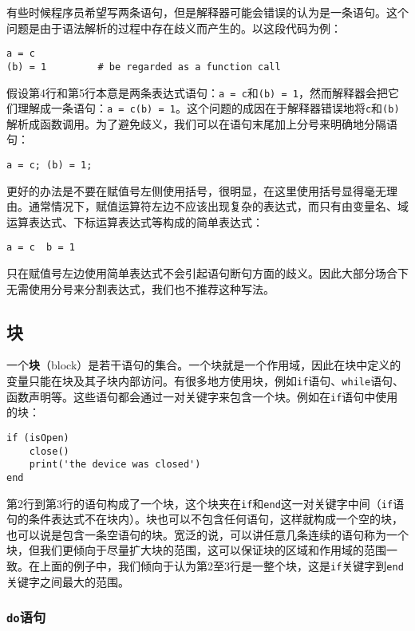 有些时候程序员希望写两条语句，但是解释器可能会错误的认为是一条语句。这个问题是由于语法解析的过程中存在歧义而产生的。以这段代码为例：
\begin{lstlisting}[language=berry, numbers=none]
a = c
(b) = 1         # be regarded as a function call
\end{lstlisting}
假设第4行和第5行本意是两条表达式语句：\texttt{a = c}和\texttt{(b) = 1}，然而解释器会把它们理解成一条语句：\texttt{a = c(b) = 1}。这个问题的成因在于解释器错误地将\texttt{c}和\texttt{(b)}解析成函数调用。为了避免歧义，我们可以在语句末尾加上分号来明确地分隔语句：
\begin{lstlisting}[language=berry, numbers=none]
a = c; (b) = 1;
\end{lstlisting}
更好的办法是不要在赋值号左侧使用括号，很明显，在这里使用括号显得毫无理由。通常情况下，赋值运算符左边不应该出现复杂的表达式，而只有由变量名、域运算表达式、下标运算表达式等构成的简单表达式：
\begin{lstlisting}[language=berry, numbers=none]
a = c  b = 1
\end{lstlisting}
只在赋值号左边使用简单表达式不会引起语句断句方面的歧义。因此大部分场合下无需使用分号来分割表达式，我们也不推荐这种写法。

\subsection{块} \label{section:block}

一个\textbf{块}（block）是若干语句的集合。一个块就是一个作用域，因此在块中定义的变量只能在块及其子块内部访问。有很多地方使用块，例如\texttt{if}语句、\texttt{while}语句、函数声明等。这些语句都会通过一对关键字来包含一个块。例如在\texttt{if}语句中使用的块：
\begin{lstlisting}[language=berry]
if (isOpen)
    close()
    print('the device was closed')
end
\end{lstlisting}
第2行到第3行的语句构成了一个块，这个块夹在\texttt{if}和\texttt{end}这一对关键字中间（\texttt{if}语句的条件表达式不在块内）。块也可以不包含任何语句，这样就构成一个空的块，也可以说是包含一条空语句的块。宽泛的说，可以讲任意几条连续的语句称为一个块，但我们更倾向于尽量扩大块的范围，这可以保证块的区域和作用域的范围一致。在上面的例子中，我们倾向于认为第2至3行是一整个块，这是\texttt{if}关键字到\texttt{end}关键字之间最大的范围。

\subsubsection{\texttt{do}语句}

